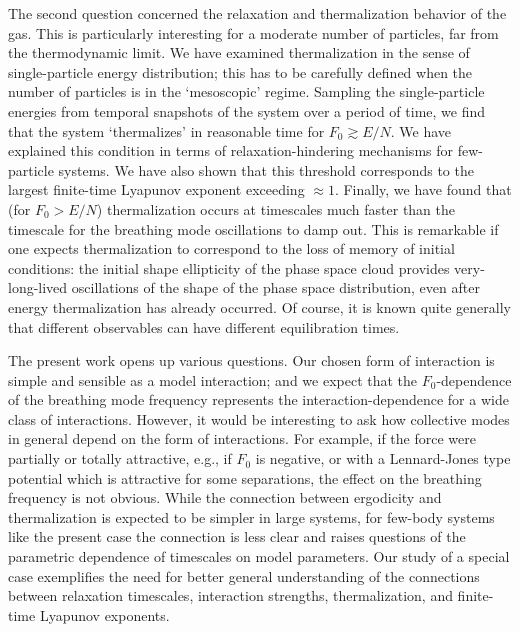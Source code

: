 \documentclass[a4paper, onecolumn]{revtex4-1}
\begin{document}
The second question concerned the relaxation and thermalization behavior of the gas.  This is
particularly interesting for a moderate number of particles, far from the thermodynamic limit.  We
have examined thermalization in the sense of single-particle energy distribution; this has to be
carefully defined when the number of particles is in the `mesoscopic' regime.  Sampling the
single-particle energies from temporal snapshots of the system over a period of time, we find that
the system `thermalizes' in reasonable time for $F_0 \gtrsim E/N$.  We have explained this condition
in terms of relaxation-hindering mechanisms for few-particle systems.  We have also shown that this
threshold corresponds to the largest finite-time Lyapunov exponent exceeding $\approx1$.  Finally,
we have found that (for $F_0 > E/N$) thermalization occurs at timescales much faster than the
timescale for the breathing mode oscillations to damp out.  This is remarkable if one expects
thermalization to correspond to the loss of memory of initial conditions: the initial shape
ellipticity of the phase space cloud provides very-long-lived oscillations of the shape of the phase
space distribution, even after energy thermalization has already occurred.  
%
Of course, it is known quite generally that different observables can have different equilibration
times.

The present work opens up various questions.  Our chosen form of interaction is simple and sensible
as a model interaction; and we expect that the $F_0$-dependence of the breathing mode frequency
represents the interaction-dependence for a wide class of interactions.  However, it would be
interesting to ask how collective modes in general depend on the form of interactions.  For example,
if the force were partially or totally attractive, e.g., if $F_0$ is negative, or with a
Lennard-Jones type potential which is attractive for some separations, the effect on the breathing
frequency is not obvious.
%
While the connection between ergodicity and thermalization is expected to be simpler in large
systems, for few-body systems like the present case the connection is less clear and raises
questions of the parametric dependence of timescales on model parameters.  Our study of a special
case exemplifies the need for better general understanding of the connections between relaxation
timescales, interaction strengths, thermalization, and finite-time Lyapunov exponents.



\end{document}
